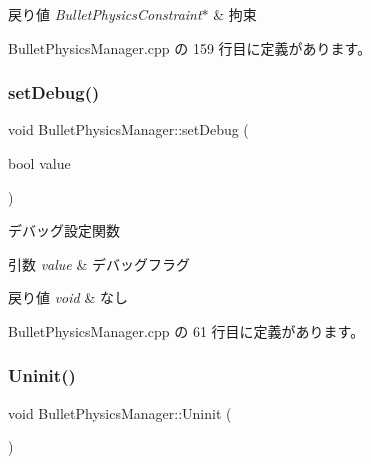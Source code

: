 \begin{DoxyRetVals}{戻り値}
{\em Bullet\+Physics\+Constraint$\ast$} & 拘束 \\
\hline
\end{DoxyRetVals}


 Bullet\+Physics\+Manager.\+cpp の 159 行目に定義があります。

\mbox{\label{class_bullet_physics_manager_ad36b472d89cdd03e1037359fae2c1a37}} 
\subsubsection{\texorpdfstring{set\+Debug()}{setDebug()}}
{\footnotesize\ttfamily void Bullet\+Physics\+Manager\+::set\+Debug (\begin{DoxyParamCaption}\item[{bool}]{value }\end{DoxyParamCaption})}



デバッグ設定関数 


\begin{DoxyParams}{引数}
{\em value} & デバッグフラグ \\
\hline
\end{DoxyParams}

\begin{DoxyRetVals}{戻り値}
{\em void} & なし \\
\hline
\end{DoxyRetVals}


 Bullet\+Physics\+Manager.\+cpp の 61 行目に定義があります。

\mbox{\label{class_bullet_physics_manager_a2c7c91e5ceec246a87e61e156920022c}} 
\subsubsection{\texorpdfstring{Uninit()}{Uninit()}}
{\footnotesize\ttfamily void Bullet\+Physics\+Manager\+::\+Uninit (\begin{DoxyParamCaption}{ }\end{DoxyParamCaption})}



